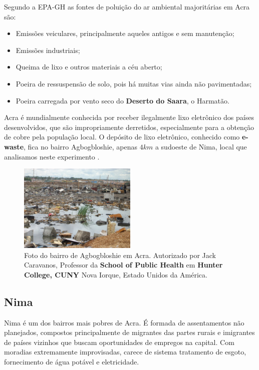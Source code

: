 
Segundo a EPA-GH \citep{epa2015} as fontes de poluição do ar ambiental 
majoritárias em Acra são:

\begin{itemize}
 \item Emissões veiculares, principalmente aqueles antigos e sem 
       manutenção;
 \item Emissões industriais;
 \item Queima de lixo e outros materiais a céu aberto;
 \item Poeira de ressuspensão de solo, pois há muitas vias ainda não pavimentadas;
 \item Poeira carregada por vento seco do \textbf{Deserto do Saara}, o Harmatão.
\end{itemize}

Acra é mundialmente conhecida por receber ilegalmente lixo 
eletrônico dos países desenvolvidos, que são impropriamente derretidos, 
especialmente para a obtenção de cobre pela população local. 
O depósito de lixo eletrônico, conhecido como \textbf{e-waste}, 
fica no bairro Agbogbloshie, apenas $4 km$ a sudoeste de Nima, 
local que analisamos neste experimento
\citep{asampong2015}.

\begin{figure}[H]
  \centering
  \includegraphics[width=0.5\textwidth]{../inputs/images/ewaste_jack_caravano.jpg}
  \caption{Foto do bairro de Agbogbloshie em Acra. Autorizado por Jack Caravanos, 
           Professor da \textbf{School of Public Health} em \textbf{Hunter College, CUNY}
           Nova Iorque, Estado Unidos da América. \label{fig:ewaste}}
\end{figure}

\subsection{Nima}

Nima é um dos bairros mais pobres de Acra. É formada de assentamentos não 
planejados, compostos principalmente de migrantes das partes rurais e 
imigrantes de países vizinhos que buscam oportunidades de empregos na capital. 
Com moradias extremamente improvisadas, carece de sistema tratamento de esgoto, 
fornecimento de água potável e eletricidade. 

